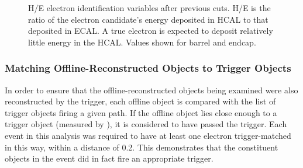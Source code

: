  \begin{figure}[htb]
  \begin{center}
  \end{center}
    \caption[H/E electron identification variables after previous cuts]{
      H/E electron identification variables after previous cuts.  
      H/E is the ratio of the electron candidate's energy deposited 
      in HCAL to that deposited in ECAL.  
      A true electron is expected to deposit relatively little energy in the HCAL.  
      Values shown for  barrel and 
       endcap.
    }
  \label{fig:hOeElecIdVars}
 \end{figure}




\subsubsection{Matching Offline-Reconstructed Objects to Trigger Objects}
\label{evSel:matching}
In order to ensure that the offline-reconstructed objects being examined were also reconstructed by the trigger, 
each offline object is compared with the list of trigger objects firing a given path.  %
If the offline object lies close enough to a trigger object (measured by \DR{}), 
it is considered to have passed the trigger.  
Each event in this analysis was required to have at least one electron trigger-matched in this way, 
within a \DR distance of 0.2.  
This demonstrates that the constituent objects in the event did in fact fire an appropriate trigger.  

